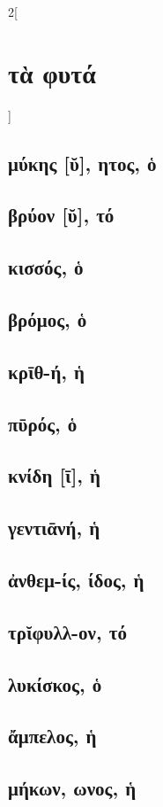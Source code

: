 \documentclass{book}
\begin{document}
\begin{multicols}{2}[\section{τὰ φυτά}]
\subsection{μύκης [ῠ], ητος, ὁ}
\subsection{βρύον [ῠ], τό}
\subsection{κισσός, ὁ}
\subsection{βρόμος, ὁ}
\subsection{κρῑθ-ή, ἡ}
\subsection{πῡρός, ὁ}
\subsection{κνίδη [ῑ], ἡ}
\subsection{γεντιᾱνή, ἡ}
\subsection{ἀνθεμ-ίς, ίδος, ἡ}
\subsection{τρῐφυλλ-ον, τό}
\subsection{λυκίσκος, ὁ}
\subsection{ἄμπελος, ἡ}
\subsection{μήκων, ωνος, ἡ}

\end{multicols}
\end{document}
